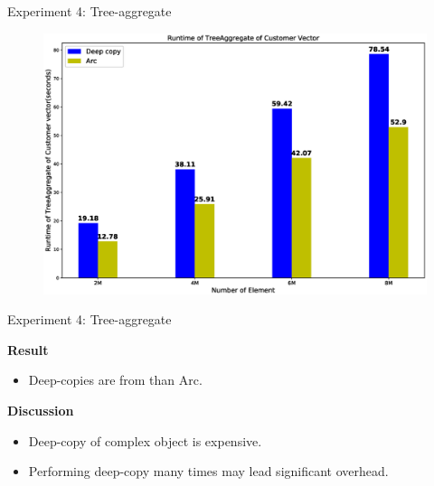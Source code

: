 \documentclass[9pt]{beamer}
\begin{document}
\begin{frame}[t, fragile]{Experiment 4: Tree-aggregate}
    \vspace{-0.7cm}
    \begin{figure}[hp]
        \centering
        \begin{center}
                \includegraphics[width=1.1\textwidth]{images/rust_tree_aggregate.eps}
                \captionsetup{labelformat=empty}
        \end{center}
    \end{figure}
\end{frame}


\begin{frame}[fragile]{Experiment 4: Tree-aggregate}

    \textbf{Result}
    \begin{itemize}
        \item Deep-copies are from  than Arc.
    \end{itemize}

    \vspace{0.5cm}

    \textbf{Discussion}
    \begin{itemize}
        \item Deep-copy of complex object is expensive.
        \item Performing deep-copy many times may lead significant overhead.
    \end{itemize}

\end{frame}
\end{document}
